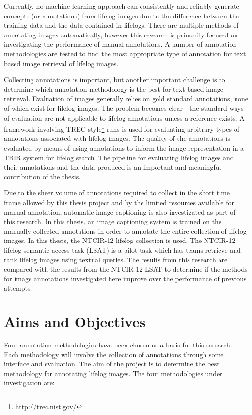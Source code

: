 Currently, no machine learning approach can consistently and reliably generate concepts (or annotations) from lifelog images due to the difference between the training data and the data contained in lifelogs. There are multiple methods of annotating images automatically, however this research is primarily focused on investigating the performance of manual annotations. A number of annotation methodologies are tested to find the most appropriate type of annotation for text based image retrieval of lifelog images.

Collecting annotations is important, but another important challenge is to determine which annotation methodology is the best for text-based image retrieval. Evaluation of images generally relies on gold standard annotations, none of which exist for lifelog images. The problem becomes clear - the standard ways of evaluation are not applicable to lifelog annotations unless a reference exists. A framework involving TREC-style\footnote{\url{http://trec.nist.gov/}} runs is used for evaluating arbitrary types of annotations associated with lifelog images. The quality of the annotations is evaluated by means of using annotations to inform the image representation in a TBIR system for lifelog search. The pipeline for evaluating lifelog images and their annotations and the data produced is an important and meaningful contribution of the thesis. 

Due to the sheer volume of annotations required to collect in the short time frame allowed by this thesis project and by the limited resources available for manual annotation, automatic image captioning is also investigated as part of this research. In this thesis, an image captioning system is trained on the manually collected annotations in order to annotate the entire collection of lifelog images. In this thesis, the NTCIR-12 lifelog collection is used. The NTCIR-12 lifelog semantic access task (LSAT) is a pilot task which has teams retrieve and rank lifelog images using textual queries. The results from this research are compared with the results from the NTCIR-12 LSAT to determine if the methods for image annotations investigated here improve over the performance of previous attempts.

\section{Aims and Objectives}

Four annotation methodologies have been chosen as a basis for this research. Each methodology will involve the collection of annotations through some interface and evaluation. The aim of the project is to determine the best methodology for annotating lifelog images. The four methodologies under investigation are: 


